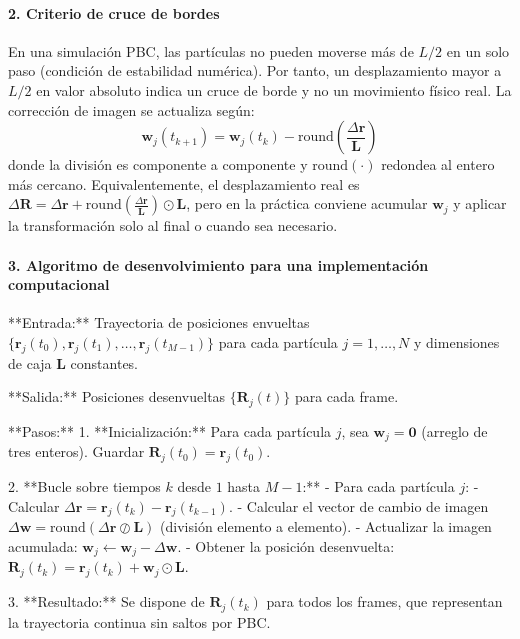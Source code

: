 \documentclass{tufte-handout}
\begin{document}
\paragraph{2. Criterio de cruce de bordes}
En una simulación PBC, las partículas no pueden moverse más de $L/2$ en un solo paso (condición de estabilidad numérica). Por tanto, un desplazamiento mayor a $L/2$ en valor absoluto indica un cruce de borde y no un movimiento físico real.  
La corrección de imagen se actualiza según:
$$ \mathbf{w}_j(t_{k+1}) = \mathbf{w}_j(t_k) - \text{round}\left( \frac{\Delta \mathbf{r}}{\mathbf{L}} \right) $$
donde la división es componente a componente y $\text{round}(\cdot)$ redondea al entero más cercano.  
Equivalentemente, el desplazamiento real es $\Delta \mathbf{R} = \Delta \mathbf{r} + \text{round}\left( \frac{\Delta \mathbf{r}}{\mathbf{L}} \right) \odot \mathbf{L}$, pero en la práctica conviene acumular $\mathbf{w}_j$ y aplicar la transformación solo al final o cuando sea necesario.

\paragraph{3. Algoritmo de desenvolvimiento para una implementación computacional}
**Entrada:** Trayectoria de posiciones envueltas $\{\mathbf{r}_j(t_0), \mathbf{r}_j(t_1), \ldots, \mathbf{r}_j(t_{M-1})\}$ para cada partícula $j=1,\dots,N$ y dimensiones de caja $\mathbf{L}$ constantes.

**Salida:** Posiciones desenvueltas $\{\mathbf{R}_j(t)\}$ para cada frame.

**Pasos:**
1. **Inicialización:** Para cada partícula $j$, sea $\mathbf{w}_j = \mathbf{0}$ (arreglo de tres enteros).  
   Guardar $\mathbf{R}_j(t_0) = \mathbf{r}_j(t_0)$.

2. **Bucle sobre tiempos $k$ desde $1$ hasta $M-1$:**
   - Para cada partícula $j$:
     - Calcular $\Delta \mathbf{r} = \mathbf{r}_j(t_k) - \mathbf{r}_j(t_{k-1})$.
     - Calcular el vector de cambio de imagen $\Delta \mathbf{w} = \text{round}(\Delta \mathbf{r} \oslash \mathbf{L})$ (división elemento a elemento).
     - Actualizar la imagen acumulada: $\mathbf{w}_j \gets \mathbf{w}_j - \Delta \mathbf{w}$.
     - Obtener la posición desenvuelta: $\mathbf{R}_j(t_k) = \mathbf{r}_j(t_k) + \mathbf{w}_j \odot \mathbf{L}$.

3. **Resultado:** Se dispone de $\mathbf{R}_j(t_k)$ para todos los frames, que representan la trayectoria continua sin saltos por PBC.
\end{document}
